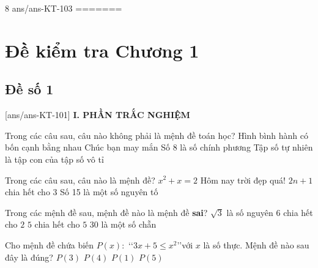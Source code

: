 \begin{indapan}{8}
	{ans/ans-KT-103}
=======
\section*{Đề kiểm tra Chương 1}
\subsection*{Đề số 1}
\setcounter{ex}{0}\setcounter{bt}{0}
[ans/ans-KT-101]
\noindent\textbf{I. PHẦN TRẮC NGHIỆM}
\begin{ex}%
	Trong các câu sau, câu nào không phải là mệnh đề toán học?
	\choice
	{Hình bình hành có bốn cạnh bằng nhau}
	{\True Chúc bạn may mắn}
	{Số $8$ là số chính phương}
	{Tập số tự nhiên là tập con của tập số vô tỉ}
\end{ex}
\begin{ex}%
	Trong các câu sau, câu nào là mệnh đề?
	\choice
	{$x^2+x=2$}
	{Hôm nay trời đẹp quá!}
	{$2n+1$ chia hết cho 3}
	{\True Số 15 là một số nguyên tố}
\end{ex}
\begin{ex}%
	Trong các mệnh đề sau, mệnh đề nào là mệnh đề \textbf{sai}?
	\choice
	{\True $\sqrt{3}$ là số nguyên}
	{$6$ chia hết cho $2$}
	{$5$ chia hết cho $5$}
	{$30$ là một số chẵn}
\end{ex}
\begin{ex}%
	Cho mệnh đề chứa biến $P(x)\colon$ \lq\lq $3x+5\le x^2$\rq\rq với $x$ là số thực. Mệnh đề nào sau đây là đúng?
	\choice
	{$P(3)$}
	{$P(4)$}
	{$P(1)$}
	{\True $P(5)$}
\end{ex}
\end{indapan}
